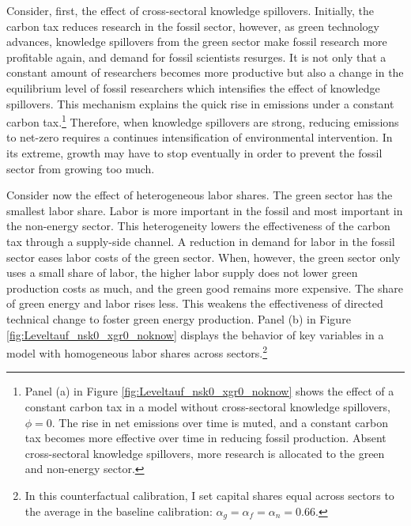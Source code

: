 Consider, first, the effect of cross-sectoral knowledge spillovers.
Initially, the carbon tax reduces research in the fossil sector, however, as green technology advances, knowledge spillovers from the green sector make fossil research more profitable again, and demand for fossil scientists resurges.
It is not only that a constant amount of researchers becomes more productive but also a change in the equilibrium level of fossil researchers which intensifies the effect of knowledge spillovers. This mechanism explains the quick rise in emissions under a constant carbon tax.\footnote{ Panel (a) in Figure \ref{fig:Leveltauf_nsk0_xgr0_noknow} shows the effect of a constant carbon tax in a model without cross-sectoral knowledge spillovers, $\phi=0$. The rise in net emissions over time is muted, and a constant carbon tax becomes more effective over time in reducing fossil production.  Absent cross-sectoral knowledge spillovers, more research is allocated to the green and non-energy sector.} 
Therefore, when knowledge spillovers are strong, reducing emissions to net-zero requires a continues intensification of environmental intervention. In its extreme, growth may have to stop eventually in order to prevent the fossil sector from growing too much.

Consider now the effect of heterogeneous labor shares. The green sector has the smallest labor share. Labor is more important in the fossil and most important in the non-energy sector. This heterogeneity lowers the effectiveness of the carbon tax through a supply-side channel. 
A reduction in demand for labor in the fossil sector eases labor costs of the green sector. When, however, the green sector only uses a small share of labor, the higher labor supply does not lower green production costs as much, and the green good remains more expensive. The share of green energy and labor rises less. This weakens the effectiveness of directed technical change to foster green energy production. 
Panel (b) in Figure \ref{fig:Leveltauf_nsk0_xgr0_noknow} displays the behavior of key variables in a model with homogeneous labor shares across sectors.\footnote{ In this counterfactual calibration, I set capital shares equal across sectors to the average in the baseline calibration: $\alpha_g=\alpha_f=\alpha_n=0.66$. } 

